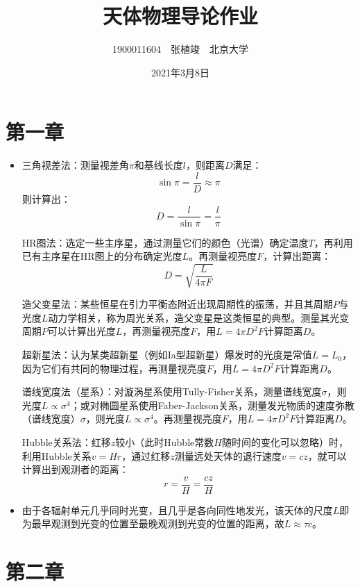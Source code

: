 \documentclass[a4paper,fontset=none]{ctexart}
\begin{document}
    \title{\textbf{天体物理导论作业}}
    \author{1900011604\ \ 张植竣\ \ 北京大学}
    \date{2021年3月8日}

    \maketitle

    \section*{第一章}

    \begin{itemize}
        \item[1.]
        三角视差法：测量视差角$\pi$和基线长度$l$，则距离$D$满足：
        \[
        \sin\pi = \frac{l}{D} \approx \pi
        \]
        则计算出：
        \[
        D = \frac{l}{\sin\pi} = \frac{l}{\pi}
        \]

        HR图法：选定一些主序星，通过测量它们的颜色（光谱）确定温度$T$，再利用已有主序星在HR图上的分布确定光度$L$。再测量视亮度$F$，计算出距离：
        \[
        D = \sqrt{\frac{L}{4\pi F}}
        \]

        造父变星法：某些恒星在引力平衡态附近出现周期性的振荡，并且其周期$P$与光度$L$动力学相关，称为周光关系，造父变星是这类恒星的典型。测量其光变周期$P$可以计算出光度$L$，再测量视亮度$F$，用$L=4\pi D^2 F$计算距离$D$。

        超新星法：认为某类超新星（例如Ia型超新星）爆发时的光度是常值$L=L_0$，因为它们有共同的物理过程，再测量视亮度$F$，用$L=4\pi D^2 F$计算距离$D$。

        谱线宽度法（星系）：对漩涡星系使用Tully-Fisher关系，测量谱线宽度$\sigma$，则光度$L \propto \sigma^4$；或对椭圆星系使用Faber-Jackson关系，测量发光物质的速度弥散（谱线宽度）$\sigma$，则光度$L \propto \sigma^4$。再测量视亮度$F$，用$L=4\pi D^2 F$计算距离$D$。

        Hubble关系法：红移$z$较小（此时Hubble常数$H$随时间的变化可以忽略）时，利用Hubble关系$v=Hr$，通过红移$z$测量远处天体的退行速度$v=cz$，就可以计算出到观测者的距离：
        \[
        r = \frac{v}{H} = \frac{cz}{H}
        \]

        \item[2.]
        由于各辐射单元几乎同时光变，且几乎是各向同性地发光，该天体的尺度$L$即为最早观测到光变的位置至最晚观测到光变的位置的距离，故$L \approx \tau c$。

    \end{itemize}

    \section*{第二章}
\end{document}
